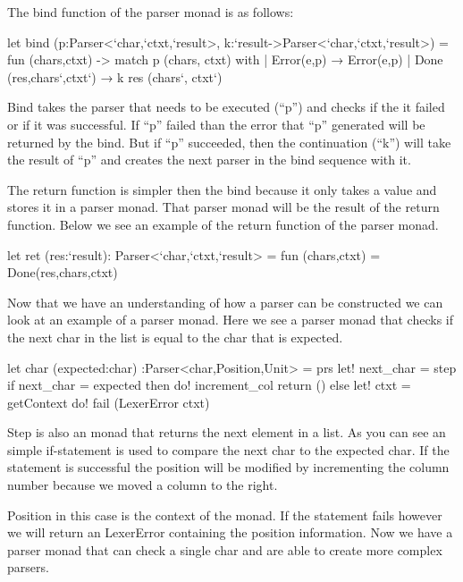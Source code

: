 The bind function of the parser monad is as follows:

\begin{code}
	let bind (p:Parser<`char,`ctxt,`result>, k:`result->Parser<`char,`ctxt,`result>) = 
		fun (chars,ctxt) ->
			match p (chars, ctxt) with
			| Error(e,p) → Error(e,p)
			| Done (res,chars`,ctxt`) →
				k res (chars`, ctxt`)
\end{code}

Bind takes the parser that needs to be executed (“p”) and checks if the it failed or if it was successful. If “p” failed  than the error that “p” generated will be returned by the bind. But if “p” succeeded, then the continuation (“k”) will take the result of  “p” and creates the next parser in the bind sequence with it.

The return function is simpler then the bind because it only takes a value and stores it in a parser monad. That parser monad will be the result of the return function. Below we see an example of the return function of the parser monad. 

\begin{code}
	let ret (res:`result): Parser<`char,`ctxt,`result> =
	fun (chars,ctxt) = Done(res,chars,ctxt)
\end{code}

Now that we have an understanding of how a parser can be constructed we can look at an example of a parser monad. Here we see a parser monad that checks if the next char in the list is equal to the char that is expected.


\begin{code}
	let char (expected:char) :Parser<char,Position,Unit> = 
	prs{ 
		let! next_char = step 
		if next_char = expected then 
			do! increment_col 
			return () 
		else 
			let! ctxt = getContext 
			do! fail (LexerError ctxt) 
	}
\end{code}

Step is also an monad that returns the next element in a list. As you can see an simple if-statement is used to compare the next char to the expected char. If the statement is successful the position will be modified by incrementing the column number because we moved a column to the right. 

Position in this case is the context of the monad. If the statement fails however we will return an LexerError containing the position information. Now we have a parser monad that can check a single char and are able to create more complex parsers. 

